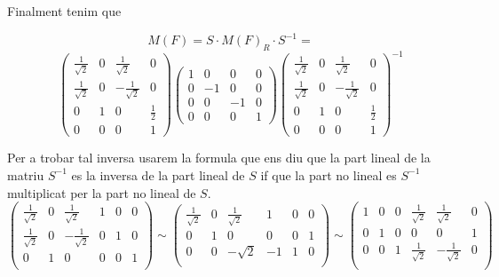 \documentclass[12pt, a4papre]{article}
\begin{document}
	Finalment tenim que 
	
	\[
	M(F)=S\cdot M(F)_R\cdot S^{-1}=
	\]
	\[
	\begin{pmatrix}
		\frac{1}{\sqrt{2}} 	&	0	&	\frac{1}{\sqrt{2}} 	&	0\\
		\frac{1}{\sqrt{2}} 	&	0	&	-\frac{1}{\sqrt{2}}	&	0\\
		0				&	1  	&	0				&	\frac{1}{2}\\
		0				&	0	& 	0				&	1
	\end{pmatrix}
	\begin{pmatrix}
		1	&	0	&	0	&	0\\
		0	&	-1	&	0	&	0\\
		0	&	0  	&	-1	&	0\\
		0	&	0	& 	0	&	1
	\end{pmatrix}
	\begin{pmatrix}
		\frac{1}{\sqrt{2}} 	&	0	&	\frac{1}{\sqrt{2}} 	&	0\\
		\frac{1}{\sqrt{2}} 	&	0	&	-\frac{1}{\sqrt{2}}	&	0\\
		0				&	1  	&	0				&	\frac{1}{2}\\
		0				&	0	& 	0				&	1
	\end{pmatrix}^{-1}
	\]
	
	Per a trobar tal inversa usarem la formula que ens diu que la part lineal de la matriu $S^{-1}$ es la inversa de la part lineal de $S$
	if que la part no lineal es $S^{-1}$ multiplicat per la part no lineal de $S$.
	\[
	\begin{pmatrix}
		\frac{1}{\sqrt{2}} 	&	0	&	\frac{1}{\sqrt{2}}  & 1 & 0 & 0\\
		\frac{1}{\sqrt{2}} 	&	0	&	-\frac{1}{\sqrt{2}} & 0 & 1 & 0\\
		0				&	1  	&	0			  & 0 & 0 & 1\\
	\end{pmatrix}
	\sim
	\begin{pmatrix}
		\frac{1}{\sqrt{2}} 	&	0	&	\frac{1}{\sqrt{2}}  & 1 & 0 & 0\\
		0			 	&	1	&	0		 	  & 0 & 0 & 1\\
		0				&	0  	&	-\sqrt{2}		  & -1 & 1& 0\\
	\end{pmatrix}
	\sim
	\begin{pmatrix}
		1 	&	0	&	0 	& \frac{1}{\sqrt{2}}	 & \frac{1}{\sqrt{2}}	 & 0\\
		0	&	1	&	0	& 0 				& 0 				& 1\\
		0	&	0  	&	1	& \frac{1}{\sqrt{2}}	& -\frac{1}{\sqrt{2}}	& 0\\
	\end{pmatrix}
	\]
	
\end{document}
